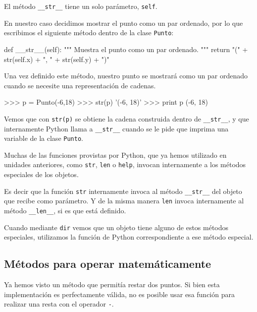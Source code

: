 El método \lstinline+__str__+ tiene un solo parámetro, \lstinline!self!.

En nuestro caso decidimos mostrar el punto como un par ordenado, por lo que
escribimos el siguiente método dentro de la clase \lstinline!Punto!:

\begin{codigo-python-sn}
    def __str__(self):
        """ Muestra el punto como un par ordenado. """
        return "(" + str(self.x) + ", " + str(self.y) + ")"
\end{codigo-python-sn}

Una vez definido este método, nuestro punto se mostrará como un par
ordenado cuando se necesite una representación de cadenas.

\begin{codigo-python-sn}
>>> p = Punto(-6,18)
>>> str(p)
'(-6, 18)'
>>> print p
(-6, 18)
\end{codigo-python-sn}

Vemos que con \lstinline!str(p)! se obtiene la cadena construida dentro de
\lstinline!__str__!, y que internamente Python llama a \lstinline!__str__!
cuando se le pide que imprima una variable de la clase \lstinline!Punto!.

\begin{sabias_que}
Muchas de las funciones provistas por Python, que ya hemos utilizado en
unidades anteriores, como \lstinline!str!, \lstinline!len! o
\lstinline!help!, invocan internamente a los métodos especiales de los
objetos.

Es decir que la función \lstinline!str!  internamente invoca al método
\lstinline!__str__! del objeto que recibe como parámetro. Y de la misma
manera \lstinline!len! invoca internamente al método \lstinline!__len__!,
si es que está definido.

Cuando mediante \lstinline!dir! vemos que un objeto tiene alguno de estos
métodos especiales, utilizamos la función de Python correspondiente
a ese método especial.
\end{sabias_que}

\subsection{Métodos para operar matemáticamente}

Ya hemos visto un método que permitía restar dos puntos.  Si bien esta
implementación es perfectamente válida, no es posible usar esa función para
realizar una resta con el operador \lstinline!-!.

